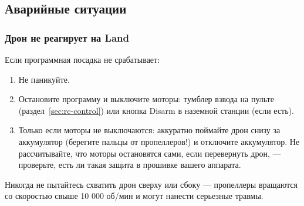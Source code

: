 \subsection{Аварийные ситуации}

\subsubsection{Дрон не реагирует на Land}
Если программная посадка не срабатывает:
\begin{enumerate}
    \item Не паникуйте.
    \item Остановите программу и выключите моторы: тумблер взвода на пульте (раздел~\ref{sec:rc-control}) или кнопка Disarm в наземной станции (если есть).
    \item Только если моторы не выключаются: аккуратно поймайте дрон снизу за аккумулятор (берегите пальцы от пропеллеров!) и отключите аккумулятор. Не рассчитывайте, что моторы остановятся сами, если перевернуть дрон, --- проверьте, есть ли такая защита в прошивке вашего аппарата.
\end{enumerate}

\begin{warnbox}[Внимание!]
Никогда не пытайтесь схватить дрон сверху или сбоку — пропеллеры вращаются со скоростью свыше 10 000 об/мин и могут нанести серьезные травмы.
\end{warnbox}
